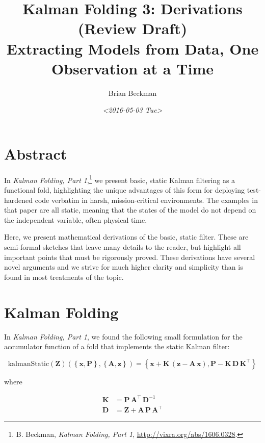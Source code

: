 \documentclass[10pt,oneside,x11names]{article}
\author{Brian Beckman}
\date{\textit{<2016-05-03 Tue>}}
\title{Kalman Folding 3: Derivations (Review Draft)\\\medskip
\large Extracting Models from Data, One Observation at a Time}
\begin{document}
\maketitle
\setcounter{tocdepth}{3}
\tableofcontents


\section{Abstract}
\label{sec:orgheadline1}

In \emph{Kalman Folding, Part 1},\footnote{B. Beckman, \emph{Kalman Folding, Part 1}, \url{http://vixra.org/abs/1606.0328}.} we present basic, static Kalman filtering
as a functional fold, highlighting the unique advantages of this form for
deploying test-hardened code verbatim in harsh, mission-critical environments.
The examples in that paper are all static, meaning that the states of the model
do not depend on the independent variable, often physical time.

Here, we present mathematical derivations of the basic, static filter. These are
semi-formal sketches that leave many details to the reader, but highlight all
important points that must be rigorously proved. These derivations have several
novel arguments and we strive for much higher clarity and simplicity than is
found in most treatments of the topic.

\section{Kalman Folding}
\label{sec:orgheadline2}

In \emph{Kalman Folding, Part 1},\footnotemark[1]{} we found the following small formulation for the
accumulator function of a fold that implements the static Kalman filter:

\begin{equation}
\label{eqn:kalman-cume-definition}
\text{kalmanStatic}
\left(
\mathbold{Z}
\right)
\left(
\left\{
\mathbold{x},
\mathbold{P}
\right\},
\left\{
\mathbold{A},
\mathbold{z}
\right\}
\right) =
\left\{
\mathbold{x}+
\mathbold{K}\,
\left(
\mathbold{z}-
\mathbold{A}\,
\mathbold{x}
\right),
\mathbold{P}-
\mathbold{K}\,
\mathbold{D}\,
\mathbold{K}^\intercal
\right\}
\end{equation}

\noindent where

\begin{align}
\label{eqn:kalman-gain-definition}
\mathbold{K}
&=
\mathbold{P}\,
\mathbold{A}^\intercal\,
\mathbold{D}^{-1} \\
\label{eqn:kalman-denominator-definition}
\mathbold{D}
&= \mathbold{Z} +
\mathbold{A}\,
\mathbold{P}\,
\mathbold{A}^\intercal
\end{align}
\end{document}
